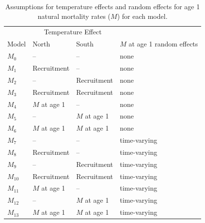 \documentclass[
]{article}
\begin{document}
\begin{table}[!h]
\centering
\caption{\label{tab:model-desc-table}Assumptions for temperature effects and random effects for age 1 natural mortality rates ($M$) for each model.}
\centering
\begin{tabular}[t]{llll}
\toprule
\multicolumn{1}{c}{ } & \multicolumn{2}{c}{Temperature Effect} & \multicolumn{1}{c}{ } \\
\cmidrule(l{3pt}r{3pt}){2-3}
Model & North & South & $M$ at age 1 random effects\\
\midrule
$M_{0}$ & -- & -- & none\\
$M_{1}$ & Recruitment & -- & none\\
$M_{2}$ & -- & Recruitment & none\\
$M_{3}$ & Recruitment & Recruitment & none\\
$M_{4}$ & $M$ at age 1 & -- & none\\
\addlinespace
$M_{5}$ & -- & $M$ at age 1 & none\\
$M_{6}$ & $M$ at age 1 & $M$ at age 1 & none\\
$M_{7}$ & -- & -- & time-varying\\
$M_{8}$ & Recruitment & -- & time-varying\\
$M_{9}$ & -- & Recruitment & time-varying\\
\addlinespace
$M_{10}$ & Recruitment & Recruitment & time-varying\\
$M_{11}$ & $M$ at age 1 & -- & time-varying\\
$M_{12}$ & -- & $M$ at age 1 & time-varying\\
$M_{13}$ & $M$ at age 1 & $M$ at age 1 & time-varying\\
\bottomrule
\end{tabular}
\end{table}
\end{document}
